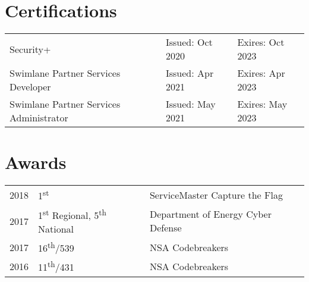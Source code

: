 \documentclass[12pt]{resume}
\begin{document}
\begin{minipage}[t]{0.66\textwidth}
\sectionsep


\section{Certifications} 
\begin{tabular}{lll}
Security+         & Issued: Oct 2020 & Exires: Oct 2023 \\
Swimlane Partner Services Developer	     & Issued: Apr 2021 & Exires: Apr 2023\\
Swimlane Partner Services Administrator	     & Issued: May 2021 & Exires: May 2023\\
\end{tabular}

\sectionsep


\section{Awards} 
\begin{tabular}{rll}
2018         & 1\textsuperscript{st} & ServiceMaster Capture the Flag \\
2017	     & 1\textsuperscript{st} Regional, 5\textsuperscript{th} National  & Department of Energy Cyber Defense\\
2017	     & 16\textsuperscript{th}/539  & NSA Codebreakers\\
2016	     & 11\textsuperscript{th}/431  & NSA Codebreakers\\
\end{tabular}
\sectionsep



\end{minipage} 
\end{document}
